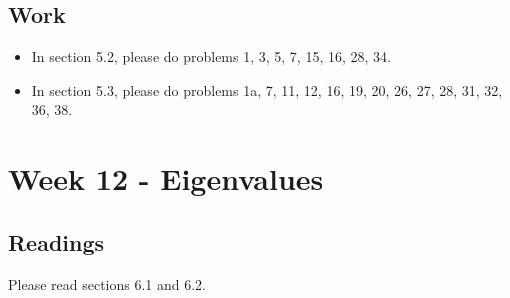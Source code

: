 	\subsection{Work}
		\begin{itemize}
			\item In section 5.2, please do problems 1, 3, 5, 7, 15, 16, 28, 34.
			\item In section 5.3, please do problems 1a, 7, 11, 12, 16, 19, 20, 26, 27, 28, 31, 32, 36, 38.
		\end{itemize}

	\clearpage



	\section{Week 12 - Eigenvalues}

	\subsection{Readings}
		Please read sections 6.1 and 6.2.


